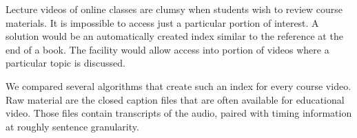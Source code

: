 Lecture videos of online classes are clumsy when students wish to
review course materials. It is impossible to access just a particular
portion of interest. A solution would be an automatically created
index similar to the reference at the end of a book. The facility
would allow access into portion of videos where a particular topic is
discussed.

We compared several algorithms that create such an index for every
course video. Raw material are the closed caption files that are often
available for educational video. Those files contain transcripts of
the audio, paired with timing information at roughly sentence
granularity.






